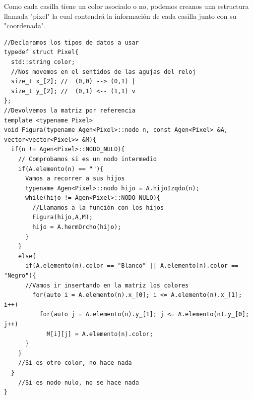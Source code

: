 Como cada casilla tiene un color asociado o no, podemos creanos una estructura llamada "pixel" la cual contendrá la información de cada casilla junto con su "coordenada".
\begin{verbatim}
//Declaramos los tipos de datos a usar
typedef struct Pixel{
  std::string color;
  //Nos movemos en el sentidos de las agujas del reloj
  size_t x_[2]; //  (0,0) --> (0,1) |
  size_t y_[2]; //  (0,1) <-- (1,1) v
};  
//Devolvemos la matriz por referencia
template <typename Pixel>
void Figura(typename Agen<Pixel>::nodo n, const Agen<Pixel> &A, vector<vector<Pixel>> &M){
  if(n != Agen<Pixel>::NODO_NULO){
    // Comprobamos si es un nodo intermedio
    if(A.elemento(n) == ""){
      Vamos a recorrer a sus hijos
      typename Agen<Pixel>::nodo hijo = A.hijoIzqdo(n);
      while(hijo != Agen<Pixel>::NODO_NULO){
        //Llamamos a la función con los hijos
        Figura(hijo,A,M);
        hijo = A.hermDrcho(hijo);
      }
    }
    else{
      if(A.elemento(n).color == "Blanco" || A.elemento(n).color == "Negro"){
      //Vamos ir insertando en la matriz los colores
        for(auto i = A.elemento(n).x_[0]; i <= A.elemento(n).x_[1]; i++)
          for(auto j = A.elemento(n).y_[1]; j <= A.elemento(n).y_[0]; j++)
            M[i][j] = A.elemento(n).color;
      }
    }
    //Si es otro color, no hace nada 
  }
    //Si es nodo nulo, no se hace nada
}
\end{verbatim}